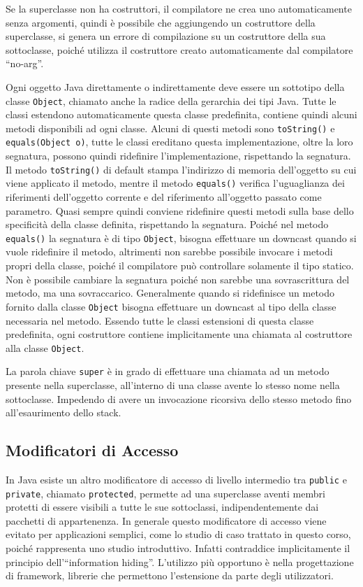\documentclass{article}
\numberwithin{equation}{subsection}
\begin{document}
Se la superclasse non ha costruttori, il compilatore ne crea uno automaticamente senza argomenti, quindi è possibile che aggiungendo un costruttore della superclasse, si 
genera un errore di compilazione su un costruttore della sua sottoclasse, poiché utilizza il costruttore creato automaticamente dal compilatore ``no-arg''. 

Ogni oggetto Java direttamente o indirettamente deve essere un sottotipo della classe \verb|Object|, chiamato anche la radice della gerarchia dei tipi Java.
Tutte le classi estendono automaticamente questa classe predefinita, contiene quindi alcuni metodi disponibili ad ogni classe. 
Alcuni di questi metodi sono \verb|toString()| e \verb|equals(Object o)|, tutte le classi ereditano questa implementazione, oltre la loro segnatura, possono quindi ridefinire 
l'implementazione, rispettando la segnatura. Il metodo \verb|toString()| di default stampa l'indirizzo di memoria dell'oggetto su cui viene applicato il metodo, mentre il metodo \verb|equals()| 
verifica l'uguaglianza dei riferimenti dell'oggetto corrente e del riferimento all'oggetto passato come parametro. 
Quasi sempre quindi conviene ridefinire questi metodi sulla base dello specificità della classe definita, rispettando la segnatura. 
Poiché nel metodo \verb|equals()| la segnatura è di tipo \verb|Object|, bisogna effettuare un downcast quando si vuole ridefinire il metodo, altrimenti non sarebbe possibile invocare 
i metodi propri della classe, poiché il compilatore può controllare solamente il tipo statico. Non è possibile cambiare la segnatura poiché non sarebbe una sovrascrittura del metodo, ma una 
sovraccarico. 
Generalmente quando si ridefinisce un metodo fornito dalla classe \verb|Object| bisogna effettuare un downcast al tipo della classe necessaria nel metodo. 
Essendo tutte le classi estensioni di questa classe predefinita, ogni costruttore contiene implicitamente una chiamata al costruttore alla classe \verb|Object|. 

La parola chiave \verb|super| è in grado di effettuare una chiamata ad un metodo presente nella superclasse, all'interno di una classe avente lo stesso nome nella 
sottoclasse. Impedendo di avere un invocazione ricorsiva dello stesso metodo fino all'esaurimento dello stack. 

\subsection{Modificatori di Accesso}

In Java esiste un altro modificatore di accesso di livello intermedio tra \verb|public| e \verb|private|, chiamato \verb|protected|, permette ad una superclasse aventi 
membri protetti di essere visibili a tutte le sue sottoclassi, indipendentemente dai pacchetti di appartenenza. 
In generale questo modificatore di accesso viene evitato per applicazioni semplici, come lo studio di caso trattato in questo corso, poiché rappresenta uno studio 
introduttivo. Infatti contraddice implicitamente il principio dell'``information hiding''. 
L'utilizzo più opportuno è nella progettazione di framework, librerie che permettono l'estensione da parte degli utilizzatori. 
\end{document}
